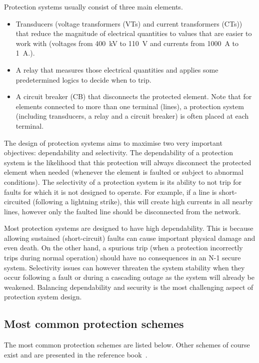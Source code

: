 Protection systems usually consist of three main elements.

\begin{itemize}
    \item Transducers (\ie voltage transformers (VTs) and current transformers (CTs)) that reduce the magnitude of electrical quantities to values that are easier to work with (\eg voltages from 400~kV to 110~V and currents from 1000~A to 1~A.).
    \item A relay that measures those electrical quantities and applies some predetermined logics to decide when to trip.
    \item A circuit breaker (CB) that disconnects the protected element. Note that for elements connected to more than one terminal (\eg lines), a protection system (including transducers, a relay and a circuit breaker) is often placed at each terminal.
\end{itemize}

The design of protection systems aims to maximise two very important objectives: dependability and selectivity. The dependability of a protection system is the likelihood that this protection will always disconnect the protected element when needed (\ie whenever the element is faulted or subject to abnormal conditions). The selectivity of a protection system is its ability to not trip for faults for which it is not designed to operate. For example, if a line is short-circuited (\eg following a lightning strike), this will create high currents in all nearby lines, however only the faulted line should be disconnected from the network.

Most protection systems are designed to have high dependability. This is because allowing sustained (\eg short-circuit) faults can cause important physical damage and even death. On the other hand, a spurious trip (\ie when a protection incorrectly trips during normal operation) should have no consequences in an N-1 secure system. Selectivity issues can however threaten the system stability when they occur following a fault or during a cascading outage as the system will already be weakened. Balancing dependability and security is the most challenging aspect of protection system design.

\subsection{Most common protection schemes}

The most common protection schemes are listed below. Other schemes of course exist and are presented in the reference book~\cite{HorowitzBook}.

